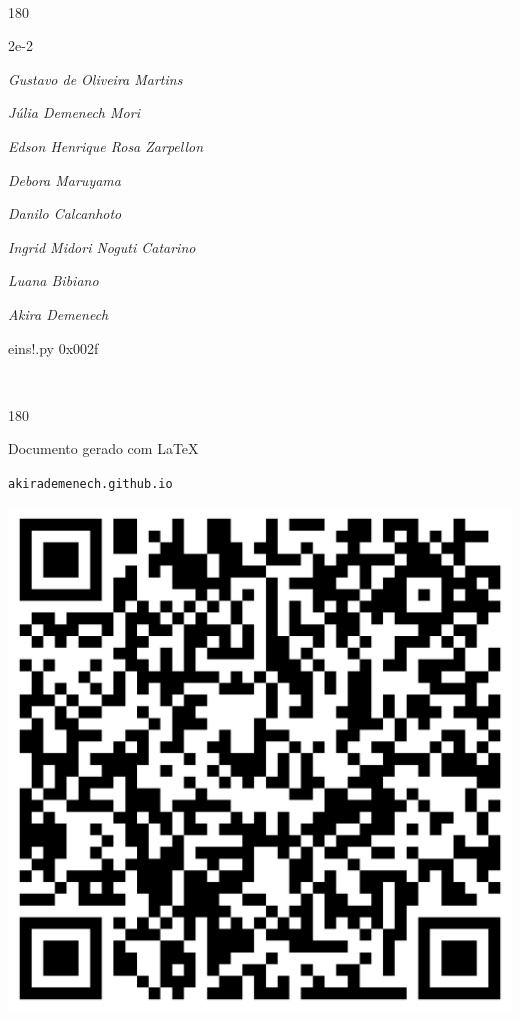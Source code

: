 \documentclass[12pt]{article}
\begin{document}
	\ 
	\vfill
	\begin{turn}{180}	
		\begin{minipage}{\textwidth}
		  	\ttfamily %
			\centering
			{\Huge 2e-2}
		  
			\hfill
		  
			

\textit{\small Gustavo de Oliveira Martins}

\textit{\small Júlia Demenech Mori}

\textit{\small Edson Henrique Rosa Zarpellon}

\textit{\small Debora Maruyama}

\textit{\small Danilo Calcanhoto}

\textit{\small Ingrid Midori Noguti Catarino}

\textit{\small Luana Bibiano}

\textit{\small Akira Demenech}

\bigskip

eins!.py
0x002f


		\end{minipage}	
	\end{turn}
	\vfill
	\

\pagebreak

	\begin{turn}{180}	
		\begin{minipage}{\textwidth}		  
		  Documento gerado com \LaTeX			
		  
		  \texttt{akirademenech.github.io}

		  \includegraphics[height=0.3\textheight]{2e-2.pdf}

		\end{minipage}	
	\end{turn}  
		  
\end{document}
